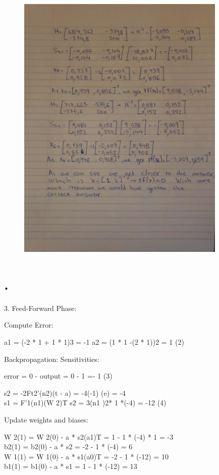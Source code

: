 \documentclass{article}
\begin{document}
\newpage
\begin{figure}[htp]
    \centering
    \includegraphics[width=10cm]{photos/2_3.jpg}
    \caption{}
    \label{}
\end{figure}
\newpage
\section{.}

3.
Feed-Forward Phase:

 



Compute Error:
 
a1 = (-2 * 1 + 1 * 1)3 = -1
a2 = (1 * 1  -(2 * 1))2 = 1	(2)
 


 


Backpropagation:
 Sensitivities:
 
error = 0 - output = 0 - 1 =- 1	(3)



s2 = -2Ft2’(n2)(t - a) = -4(-1) (e) = -4\\
s1 = F’1(n1)(W 2)T s2 = 3(n1 )2* 1 *(-4) = -12	(4)
 
Update weights and biases:

W 2(1) = W 2(0) - a * s2(a1)T  = 1 - 1 * (-4) * 1 = -3\\
b2(1) = b2(0) - a * s2 = -2 - 1 * (-4) = 6\\
W 1(1) = W 1(0) - a * s1(a0)T  = -2 - 1 * (-12) = 10\\
b1(1) = b1(0) - a * s1 = 1 - 1 * (-12) = 13\\
 
\end{document}
